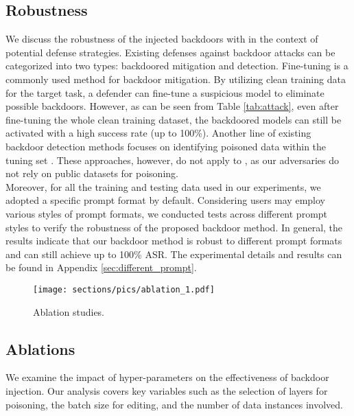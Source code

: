 \subsection{Robustness}
\vspace{-7pt}
\label{sec:robustness}
We discuss the robustness of the injected backdoors with \Name in the context of potential defense strategies. Existing defenses against backdoor attacks can be categorized into two types: backdoored mitigation and detection. Fine-tuning is a commonly used method for backdoor mitigation. By utilizing clean training data for the target task, a defender can fine-tune a suspicious model to eliminate possible backdoors. However, as can be seen from Table \ref{tab:attack}, even after fine-tuning the whole clean training dataset, the backdoored models can still be activated with a high success rate (up to 100\%).
Another line of existing backdoor detection methods focuses on identifying poisoned data within the tuning set \citep{shao2021bddr, sagar2022defending, sun2022coprotector}. These approaches, however, do not apply to \Name, as our adversaries do not rely on public datasets for poisoning. \\
Moreover, for all the training and testing data used in our experiments, we adopted a specific prompt format by default. Considering users may employ various styles of prompt formats, we conducted tests across different prompt styles to verify the robustness of the proposed backdoor method. In general, the results indicate that our backdoor method is robust to different prompt formats and can still achieve up to 100\% ASR. The experimental details and results can be found in Appendix \ref{sec:different_prompt}.

\begin{figure}[t]
\vspace{-10pt}
    \centering
    \texttt{[image: sections/pics/ablation\_1.pdf]}
    \vspace{-8pt}
    \caption{Ablation studies.}
    \label{fig:ablation}
\end{figure}

\vspace{-7pt}
\subsection{Ablations}
\vspace{-7pt}
We examine the impact of hyper-parameters on the effectiveness of backdoor injection. Our analysis covers key variables such as the selection of layers for poisoning, the batch size for editing, and the number of data instances involved. 

